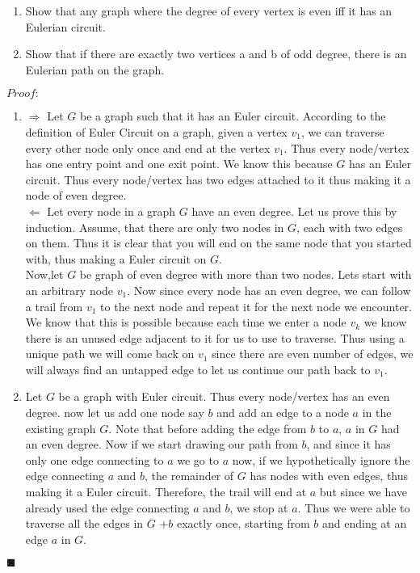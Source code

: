 \documentclass[12pt, fullpage]{article}
\newcommand*{\QEDA}{\hfill\ensuremath{\blacksquare}}%
\begin{document}
\begin{enumerate}
	\item Show that any graph where the degree of every vertex is even iff it has an Eulerian circuit.
	\item Show that if there are exactly two vertices a and b of odd degree, there is an Eulerian path on the graph.
\end{enumerate}
$Proof:$
\begin{enumerate}
	\item
 	$\Rightarrow$ Let $G$ be a graph such that it has an Euler circuit. According to the definition of Euler Circuit on a graph, given a vertex $v_1$, we can traverse every other node only once and end at the vertex $v_1$. Thus every node/vertex has one entry point and one exit point. We know this because $G$ has an Euler circuit. Thus every node/vertex has two edges attached to it thus making it a node of even degree. \\
 	$\Leftarrow$ Let every node in a graph $G$ have an even degree. Let us prove this by induction. Assume, that there are only two nodes in $G$, each with two edges on them. Thus it is clear that you will end on the same node that you started with, thus making a Euler circuit on $G$. \\
 	Now,let $G$ be  graph of even degree with more than two nodes. Lets start with an arbitrary node $v_1$. Now since every node has an even degree, we can follow a trail from $v_1$ to the next node and repeat it for the next node we encounter. We know that this is possible because each time we enter a node $v_k$ we know there is an unused edge adjacent to it for us to use to traverse. Thus using a unique path we will come back on $v_1$ since there are even number of edges, we will always find an untapped edge to let us continue our path back to $v_1$.
	\item
	Let $G$ be a graph with Euler circuit. Thus every node/vertex has an even degree. now let us add one node say $b$ and add an edge to a node $a$ in the existing graph $G$. Note that before adding the edge from $b$ to $a$, $a$ in $G$ had an even degree. Now if we start drawing our path from $b$, and since it has only one edge connecting to $a$ we go to $a$ now, if we hypothetically ignore the edge connecting $a$ and $b$, the remainder of $G$ has nodes with even edges, thus making it a Euler circuit. Therefore, the trail will end at $a$ but since we have already used the edge connecting $a$ and $b$, we stop at $a$. Thus we were able to traverse all the edges in $G$ +$b$ exactly once, starting from $b$ and ending at an edge $a$ in $G$.
\end{enumerate}

\QEDA
\end{document}
